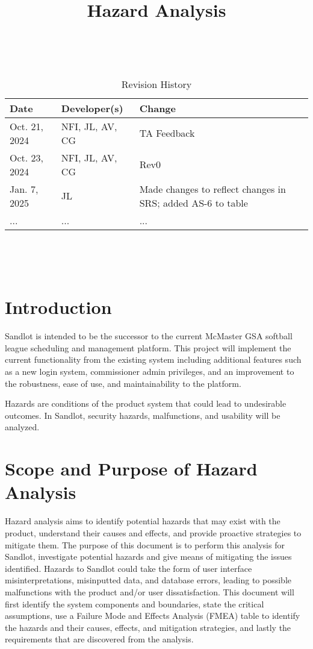 \documentclass{article}
\title{Hazard Analysis\\\progname}
\author{\authname}
\date{}
\begin{document}
\maketitle
\thispagestyle{empty}

~\newpage


\begin{table}[hp]
\caption{Revision History} \label{TblRevisionHistory}
\begin{tabularx}{\textwidth}{llX}
\toprule
\textbf{Date} & \textbf{Developer(s)} & \textbf{Change}\\
\midrule
Oct. 21, 2024 & NFI, JL, AV, CG & TA Feedback\\
Oct. 23, 2024 & NFI, JL, AV, CG & Rev0\\
Jan. 7, 2025 & JL & Made changes to reflect changes in SRS; added AS-6 to table\\
... & ... & ...\\
\bottomrule
\end{tabularx}
\end{table}

~\newpage

\tableofcontents

~\newpage


\section{Introduction}

Sandlot is intended to be the successor to the current McMaster GSA
softball league scheduling and management platform. This project
will implement the current functionality from the existing system including
additional features such as a new login system, commissioner admin
privileges, and an improvement to the robustness, ease of use, and
maintainability to the platform.

Hazards are conditions of the product system that could lead to undesirable outcomes. 
In Sandlot, security hazards, malfunctions, and usability will be analyzed.

\section{Scope and Purpose of Hazard Analysis}

Hazard analysis aims to identify potential hazards that may exist with the product, 
understand their causes and effects, and provide proactive strategies to mitigate
them.
The purpose of this document is to perform this analysis for Sandlot, investigate potential
hazards and give means of mitigating the issues identified. 
Hazards to Sandlot could take the form of user interface misinterpretations, misinputted data,
and database errors, leading to possible malfunctions with the product and/or user 
dissatisfaction.
This document will first identify the system components and boundaries, state the critical
assumptions, use a Failure Mode and Effects Analysis (FMEA) table to identify the hazards
and their causes, effects, and mitigation strategies, and lastly the requirements that
are discovered from the analysis.
\end{document}
